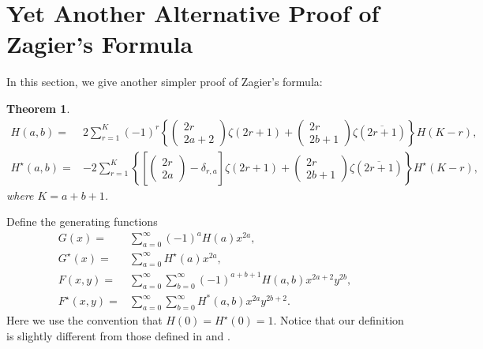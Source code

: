 \documentclass[reqno]{amsart}
\newtheorem{theorem}{Theorem}[section]
\theoremstyle{definition}
\theoremstyle{remark}
\numberwithin{equation}{section}
\begin{document}
\bigskip
\section{Yet Another Alternative Proof of Zagier's Formula}
In this section, we give another simpler proof of Zagier's formula:
\begin{theorem}\label{Zagier2}
\begin{align}
H(a, b)=&2\sum_{r=1}^{K}(-1)^r\left\{\begin{pmatrix} 2r\\2a+2\end{pmatrix}\zeta(2r+1)+\begin{pmatrix} 2r\\2b+1\end{pmatrix}\zeta(\overline{2r+1})\right\}H(K-r),\label{eq62}\\
H^{\star}(a, b)=&-2\sum_{r=1}^{K} \left\{\left[\begin{pmatrix} 2r\\2a\end{pmatrix}-\delta_{r,a}\right]\zeta(2r+1)+\begin{pmatrix} 2r\\2b+1\end{pmatrix}\zeta(\overline{2r+1})\right\}H^{\star}(K-r),\label{eq63}
\end{align}where $K=a+b+1$.
\end{theorem}
Define the generating functions
\begin{align*}
G(x)=&\sum_{a=0}^{\infty}(-1)^a H(a)x^{2a},\\
G^{\star}(x)=&\sum_{a=0}^{\infty} H^{\star}(a)x^{2a},\\
F(x,y)=&\sum_{a=0}^{\infty}\sum_{b=0}^{\infty} (-1)^{a+b+1}H(a,b)x^{2a+2}y^{2b},\\
F^{\star}(x,y)=&\sum_{a=0}^{\infty}\sum_{b=0}^{\infty}  H^*(a,b)x^{2a}y^{2b+2}.
\end{align*}Here we use the convention that $H(0)=H^{\star}(0)=1$. Notice that our definition is slightly different from those defined in \cite{1} and \cite{3}.
\end{document}
